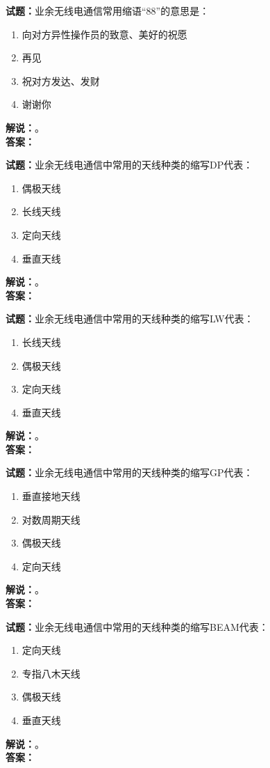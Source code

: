 \documentclass{ctexbook}
\begin{document}
\bigskip

\noindent\textbf{试题：}业余无线电通信常用缩语“88”的意思是：
\begin{enumerate}[leftmargin=3em]
  \item 向对方异性操作员的致意、美好的祝愿
  \item 再见
  \item 祝对方发达、发财
  \item 谢谢你
\end{enumerate}
\noindent\textbf{解说：}\textbf{}。\\\noindent\textbf{答案：}

\bigskip

\noindent\textbf{试题：}业余无线电通信中常用的天线种类的缩写DP代表：
\begin{enumerate}[leftmargin=3em]
  \item 偶极天线
  \item 长线天线
  \item 定向天线
  \item 垂直天线
\end{enumerate}
\noindent\textbf{解说：}\textbf{}。\\\noindent\textbf{答案：}

\bigskip

\noindent\textbf{试题：}业余无线电通信中常用的天线种类的缩写LW代表：
\begin{enumerate}[leftmargin=3em]
  \item 长线天线
  \item 偶极天线
  \item 定向天线
  \item 垂直天线
\end{enumerate}
\noindent\textbf{解说：}\textbf{}。\\\noindent\textbf{答案：}

\bigskip

\noindent\textbf{试题：}业余无线电通信中常用的天线种类的缩写GP代表：
\begin{enumerate}[leftmargin=3em]
  \item 垂直接地天线
  \item 对数周期天线
  \item 偶极天线
  \item 定向天线
\end{enumerate}
\noindent\textbf{解说：}\textbf{}。\\\noindent\textbf{答案：}

\bigskip

\noindent\textbf{试题：}业余无线电通信中常用的天线种类的缩写BEAM代表：
\begin{enumerate}[leftmargin=3em]
  \item 定向天线
  \item 专指八木天线
  \item 偶极天线
  \item 垂直天线
\end{enumerate}
\noindent\textbf{解说：}\textbf{}。\\\noindent\textbf{答案：}
\end{document}
